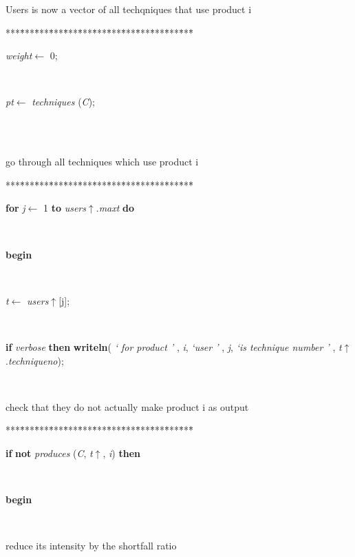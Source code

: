 Users is now a vector of all techqniques that use product i
\begin{tabbing}
***\=***\=***\=***\=***\=***\=***\=***\=***\=***\=***\=***\=***\=\kill
\+ \+ \+ \+ \+ \\
\parbox{14cm}{\textsf{\textit{weight}$\leftarrow$ 0}; }\\
\parbox{14cm}{\textsf{\textit{pt}$\leftarrow$ \textit{techniques} (\textit{C})}; }\\
\\
\end{tabbing}
go through all techniques which use product i
\begin{tabbing}
***\=***\=***\=***\=***\=***\=***\=***\=***\=***\=***\=***\=***\=\kill
\+ \+ \+ \+ \+ \\
\+\parbox{14cm}{\textsf {\textbf {for } \textsf{\textit{j}$\leftarrow$ 1} \textbf{ to } \textsf{\textit{users}$\uparrow$.\textit{maxt}} \textbf{ do } }}\\
\<\parbox{14cm}{\textsf{\textbf{begin} }}\\
\parbox{14cm}{\textsf{\textit{t}$\leftarrow$ \textit{users}$\uparrow$\textit{}[j]}; }\\
\parbox{14cm}{\textsf {\textbf {if } \textsf{\textit{verbose}} \textbf{ then } \textsf{\textbf{writeln}(\textit{\textrm{\textup { ` for product ' } }}, \textit{i}, \textit{\textrm{\textup { `user ' } }}, \textit{j}, \textit{\textrm{\textup { `is technique number ' } }}, \textit{t}$\uparrow$.\textit{techniqueno})}; }}\\
\end{tabbing}
check that they do not actually make product i as output
\begin{tabbing}
***\=***\=***\=***\=***\=***\=***\=***\=***\=***\=***\=***\=***\=\kill
\+ \+ \+ \+ \+ \+ \\
\+\parbox{14cm}{\textsf {\textbf {if } \textsf{\textbf{not} \textit{produces} (\textit{C}, \textit{t}$\uparrow$\textit{}, \textit{i}) } \textbf{ then } }}\\
\<\parbox{14cm}{\textsf{\textbf{begin} }}\\
\end{tabbing}
reduce its intensity by the shortfall ratio
